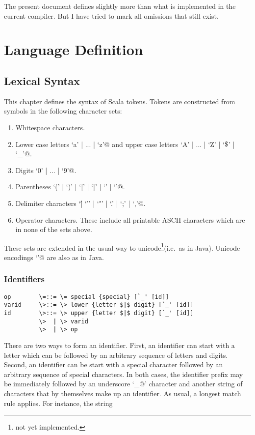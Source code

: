 \documentclass[11pt]{report}
\newcommand{\notyet}{\footnote{not yet implemented.}}
\begin{document}
The present document defines slightly more than what is implemented in
the current compiler. But I have tried to mark all omissions that
still exist.

\part{Language Definition}

\chapter{Lexical Syntax}

This chapter defines the syntax of Scala tokens. Tokens are
constructed from symbols in the following character sets:
\begin{enumerate}
\item Whitespace characters.
\item Lower case letters \verb@`a' | ... | `z'@ and
upper case letters \verb@`A' | ... | `Z' | `$\Dollar$' | `_'@.
\item Digits \verb@`0' | ... | `9'@.
\item Parentheses \verb@`(' | `)' | `[' | `]' | `{' | `}'@.
\item Delimiter characters \verb@`\' | `'' | `"' | `.' | `;' | `,'@.
\item Operator characters. These include all printable ASCII characters
which are in none of the sets above.
\end{enumerate}

These sets are extended in the usual way to unicode\notyet (i.e.\ as in Java).
Unicode encodings \verb@`\uXXXX'@ are also as in Java.

\section{Identifiers}

\syntax\begin{verbatim}
op        \=::= \= special {special} [`_' [id]]
varid     \>::= \> lower {letter $|$ digit} [`_' [id]]
id        \>::= \> upper {letter $|$ digit} [`_' [id]]
          \>  | \> varid
          \>  | \> op
\end{verbatim}

There are two ways to form an identifier. First, an identifier can
start with a letter which can be followed by an arbitrary sequence of
letters and digits. Second, an identifier can be start with a special
character followed by an arbitrary sequence of special characters.
In both cases, the identifier prefix may be immediately followed
by an underscore `\verb@_@' character and another string of characters
that by themselves make up an identifier.  As usual, a longest match
rule applies. For instance, the string
\end{document}
